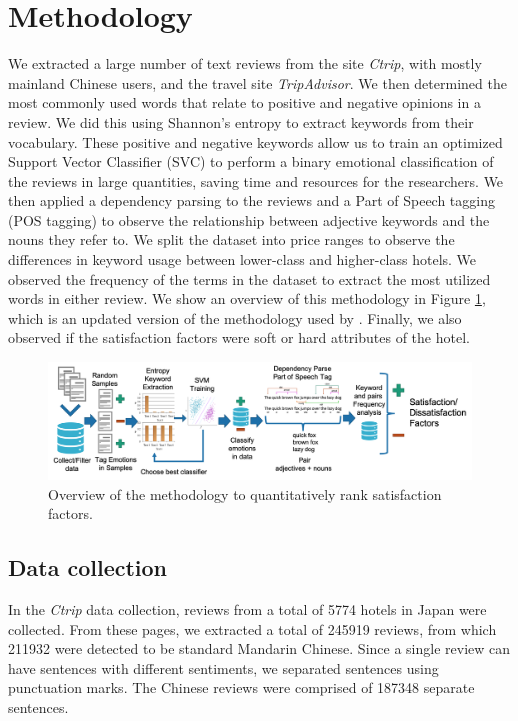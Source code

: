 \documentclass[smallextended,natbib]{svjour3}       %
\begin{document}
\section{Methodology}\label{method}

  We extracted a large number of text reviews from the site \textit{Ctrip}, with mostly mainland Chinese users, and the travel site \textit{TripAdvisor}. We then determined the most commonly used words that relate to positive and negative opinions in a review. We did this using Shannon's entropy to extract keywords from their vocabulary. These positive and negative keywords allow us to train an optimized Support Vector Classifier (SVC) to perform a binary emotional classification of the reviews in large quantities, saving time and resources for the researchers. We then applied a dependency parsing to the reviews and a Part of Speech tagging (POS tagging) to observe the relationship between adjective keywords and the nouns they refer to. We split the dataset into price ranges to observe the differences in keyword usage between lower-class and higher-class hotels. We observed the frequency of the terms in the dataset to extract the most utilized words in either review. We show an overview of this methodology in Figure \ref{fig:method-overview}, which is an updated version of the methodology used by \cite{Aleman2018ICAROB}. Finally, we also observed if the satisfaction factors were soft or hard attributes of the hotel.

  \begin{figure}[bp]
  \centering
  \includegraphics[width=\textwidth]{emotion-method-overview_V3.png}
  \caption{Overview of the methodology to quantitatively rank satisfaction factors.}
  \label{fig:method-overview}
  \end{figure}

  \subsection{Data collection}\label{datacollection}

    In the \textit{Ctrip} data collection, reviews from a total of \num[group-separator={,}]{5774} hotels in Japan were collected. From these pages, we extracted a total of \num[group-separator={,}]{245919} reviews, from which \num[group-separator={,}]{211932} were detected to be standard Mandarin Chinese. Since a single review can have sentences with different sentiments, we separated sentences using punctuation marks. The Chinese reviews were comprised of \num[group-separator={,}]{187348} separate sentences. 
\end{document}

